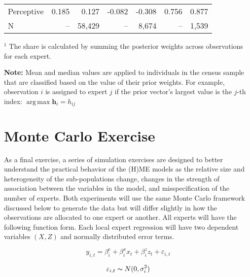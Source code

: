 \documentclass[12pt]{article}
\DeclareMathOperator*{\argmax}{arg\,max}
\theoremstyle{definition}
\begin{document}
\begin{table}
\begin{threeparttable}
\begin{tabular}[l]{l r r r r r r}
      Perceptive            &   0.185 &   0.127 & -0.082 & -0.308 &   0.756 &   0.877 \\
      \cmidrule{1-7}
      N                     &      -- &  58,429 &     -- &  8,674 &      -- &   1,539 \\
      \hline
        \end{tabular}
        \begin{tablenotes}
          \item{\footnotesize $^{1}$ The share is calculated by summing the 
          posterior weights across observations for each expert.}
          \item{\footnotesize \textbf{Note:} Mean and median values are applied to individuals in the census sample that are classified based on the value of their prior weights. For example, observation $i$ is assigned to expert $j$ if the prior vector's largest value is the $j$-th index: $\argmax \boldsymbol{h}_{i} = h_{ij}$}
        \end{tablenotes} \label{tbl:HME3_sample_comparison}
      \end{threeparttable}
    \end{table}
  

\clearpage


\section{Monte Carlo Exercise} \label{sec:MonteCarlo}

As a final exercise, a series of simulation exercises are designed to better understand the practical behavior of the (H)ME models as the relative size and heterogeneity of the sub-populations change, changes in the strength of association between the variables in the model, and misspecification of the number of experts. Both experiments will use the same Monte Carlo framework discussed below to generate the data but will differ slightly in how the observations are allocated to one expert or another. All experts will have the following function form. Each local expert regression will have two dependent variables $(X, Z)$ and normally distributed error terms. 

\begin{equation} \label{eq:MC_regression_eq}
    y_{i,t} = \beta_{i}^{c} + \beta_{i}^{x}  x_{t} + \beta_{i}^{z}  z_{t} + \varepsilon_{i,t}
\end{equation}

\begin{equation} \label{eq:MC_regression_errors}
    \varepsilon_{i,t} \thicksim N(0, \sigma^{2}_{i})
\end{equation}
\end{document}
